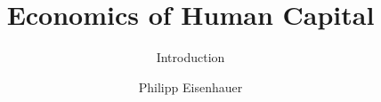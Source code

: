 

\title{Economics of Human Capital}
\subtitle{\vspace{0.3cm}Introduction}
\author{Philipp Eisenhauer}

\date{}

\let\otp\titlepage
